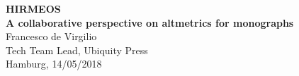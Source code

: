 \documentclass[xcolor=svgnames]{beamer}
\begin{document}

    \begin{frame}
        \begin{center}
            \color{RoyalBlue}
            \textbf{
                \Huge{HIRMEOS}\\
                \Large{A collaborative perspective on altmetrics for monographs}\\
            }
            \vspace{40pt}
            Francesco de Virgilio\\
            \vspace{8pt}
            \scriptsize{Tech Team Lead, Ubiquity Press}\\
            \scriptsize{Hamburg, 14/05/2018}
        \end{center}
    \end{frame}
\end{document}
